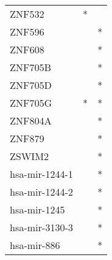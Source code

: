 \begin{longtable}{lcc}
ZNF532          &              * &            \\
ZNF596          &                &          * \\
ZNF608          &                &          * \\
ZNF705B         &                &          * \\
ZNF705D         &                &          * \\
ZNF705G         &              * &          * \\
ZNF804A         &                &          * \\
ZNF879          &                &          * \\
ZSWIM2          &                &          * \\
hsa-mir-1244-1  &                &          * \\
hsa-mir-1244-2  &                &          * \\
hsa-mir-1245    &                &          * \\
hsa-mir-3130-3  &                &          * \\
hsa-mir-886     &                &          * \\
\end{longtable}
